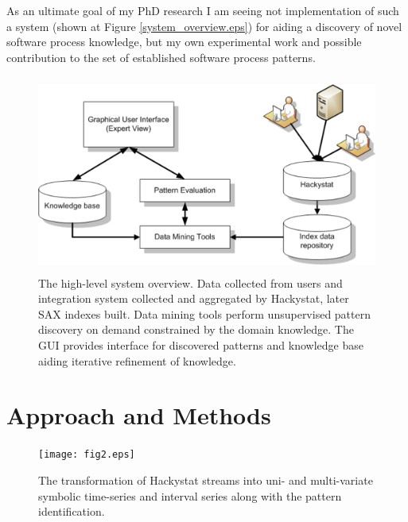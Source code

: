 \documentclass[11pt,oneside]{article}
\begin{document}
As an ultimate goal of my PhD research I am seeing not implementation of such a system (shown at Figure \ref{system_overview.eps}) for aiding a discovery of novel software process knowledge, but my own experimental work and possible contribution to the set of established software process patterns.

\begin{figure}[tbp]
   \centering
   \includegraphics[height=65mm]{system_overview.eps}
   \caption{The high-level system overview. Data collected from users and integration system collected and aggregated by Hackystat, later SAX indexes built. Data mining tools perform unsupervised pattern discovery on demand constrained by the domain knowledge. The GUI provides interface for discovered patterns and knowledge base aiding iterative refinement of knowledge.}
   \label{fig:system_overview}
\end{figure}


\section{Approach and Methods}

\begin{figure}[tbp]
   \centering
   \texttt{[image: fig2.eps]}
   \caption{The transformation of Hackystat streams into uni- and multi-variate symbolic time-series and interval series along with the pattern identification.}
   \label{fig:fig2}
\end{figure}
\end{document}
